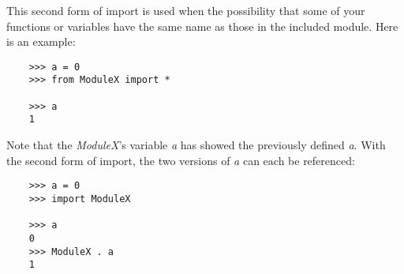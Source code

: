 This second form of import is used when the possibility that
some of your functions or variables have the same name as
those in the included module. Here is an example:

\begin{verbatim}
    >>> a = 0
    >>> from ModuleX import *

    >>> a
    1
\end{verbatim}

Note that the {\it ModuleX}'s variable {\it a} has showed the previously
defined {\it a}. With the second form of import, the two versions
of {\it a} can each be referenced:

\begin{verbatim}
    >>> a = 0
    >>> import ModuleX

    >>> a
    0
    >>> ModuleX . a
    1
\end{verbatim}
